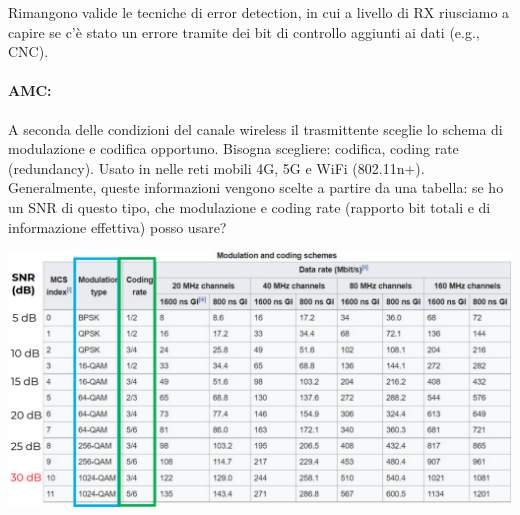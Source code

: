 Rimangono valide le tecniche di error detection, in cui a livello di RX riusciamo a capire se c'è stato un errore tramite dei bit di controllo aggiunti ai dati (e.g., CNC).

\paragraph{AMC:} A seconda delle condizioni del canale wireless il trasmittente sceglie lo schema di modulazione e codifica opportuno. Bisogna scegliere: codifica, coding rate (redundancy). Usato in nelle reti mobili 4G, 5G e WiFi (802.11n+). Generalmente, queste informazioni vengono scelte a partire da una tabella: se ho un SNR di questo tipo, che modulazione e coding rate (rapporto bit totali e di informazione effettiva) posso usare?  
\begin{center}
	\includegraphics[width=0.95\linewidth]{img/wireless/mcruppolo}
\end{center}





